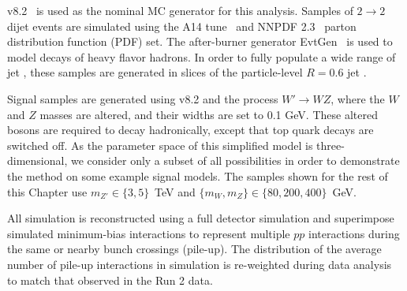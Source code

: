\PYTHIA{} v8.2~\cite{Sjostrand:2007gs,Sjostrand:2006za} is used as the nominal MC generator for this analysis.
Samples of $2\rightarrow 2$ dijet events are simulated using the A14 tune~\cite{ATL-PHYS-PUB-2014-021} and NNPDF 2.3~\cite{Ball:2012cx} parton distribution function (PDF) set.
The after-burner generator EvtGen~\cite{Lange:2001uf} is used to model decays of heavy flavor hadrons.
In order to fully populate a wide range of jet \pt, these samples are generated in slices of the particle-level $R=0.6$ jet \pt.

Signal samples are generated using \PYTHIA{} v8.2 and the process $W'\rightarrow WZ$, where the $W$ and $Z$ masses are altered, and their widths are set to 0.1 GeV.
These altered bosons are required to decay hadronically, except that top quark decays are switched off.
As the parameter space of this simplified model is three-dimensional, we consider only a subset of all possibilities in order to demonstrate the method on some example signal models.
The samples shown for the rest of this Chapter use $m_{Z'}\in\{3,5\}$~TeV and $\{m_W,m_Z\}\in\{80,200,400\}$~GeV.

All simulation is reconstructed using a full detector simulation and superimpose simulated minimum-bias interactions to represent multiple $pp$ interactions during the same or nearby bunch crossings (pile-up).
The distribution of the average number of pile-up interactions in simulation is re-weighted during data analysis to match that observed in the Run 2 data.


\FloatBarrier
